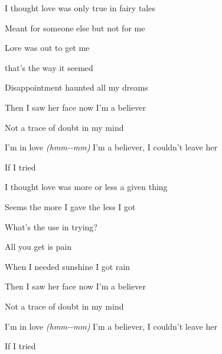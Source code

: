 \begin{song}


\begin{hchordbox}
\end{hchordbox}

\bigskip

I thought love was only true in fairy tales  \par
{}Meant for someone else but not for me \par
{} Love was out to get me  \par
{} that's the way it seemed  \par
{} Disappointment haunted all my dreams  \par

\bigskip

Then I saw her face   now I'm a believer   \par
Not a trace   of doubt in my mind   \par
I'm in love \textit{(hmm-}\textit{-mm)} I'm a believer, I couldn't leave her \par
If I tried \par

\bigskip

I thought love was more or less a given thing \par
{}Seems the more I gave the less I got \par
{}What's the use in trying?  \par
{} All you get is pain  \par
{} When I needed sunshine I got rain  \par

\bigskip

Then I saw her face   now I'm a believer   \par
Not a trace   of doubt in my mind   \par
I'm in love \textit{(hmm-}\textit{-mm)} I'm a believer, I couldn't leave her \par
If I tried \par


\end{song}
